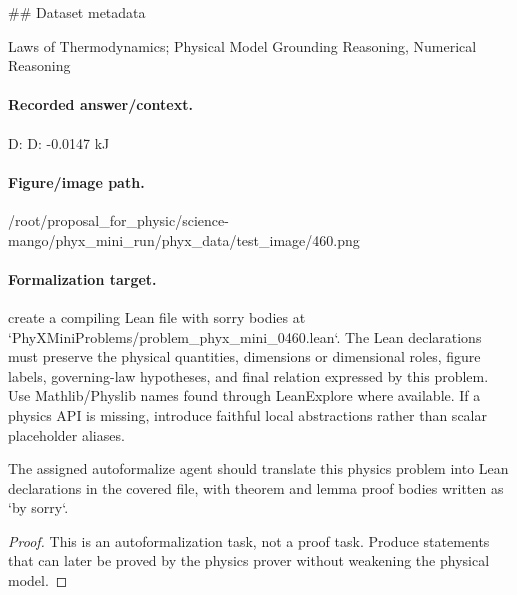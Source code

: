 \#\# Dataset metadata

Laws of Thermodynamics; Physical Model Grounding Reasoning, Numerical Reasoning

\paragraph{Recorded answer/context.}
D: D: -0.0147 kJ

\paragraph{Figure/image path.}
/root/proposal\_for\_physic/science-mango/phyx\_mini\_run/phyx\_data/test\_image/460.png

\paragraph{Formalization target.}
create a compiling Lean file with sorry bodies at `PhyXMiniProblems/problem\_phyx\_mini\_0460.lean`. The Lean declarations must preserve the physical quantities, dimensions or dimensional roles, figure labels, governing-law hypotheses, and final relation expressed by this problem.
Use Mathlib/Physlib names found through LeanExplore where available. If a physics API is missing, introduce faithful local abstractions rather than scalar placeholder aliases.

\begin{theorem}
\label{thm:physics:phyx_mini_0460:target}
The assigned autoformalize agent should translate this physics problem into Lean declarations in the covered file, with theorem and lemma proof bodies written as `by sorry`.
\end{theorem}
\begin{proof}
This is an autoformalization task, not a proof task. Produce statements that can later be proved by the physics prover without weakening the physical model.
\end{proof}


